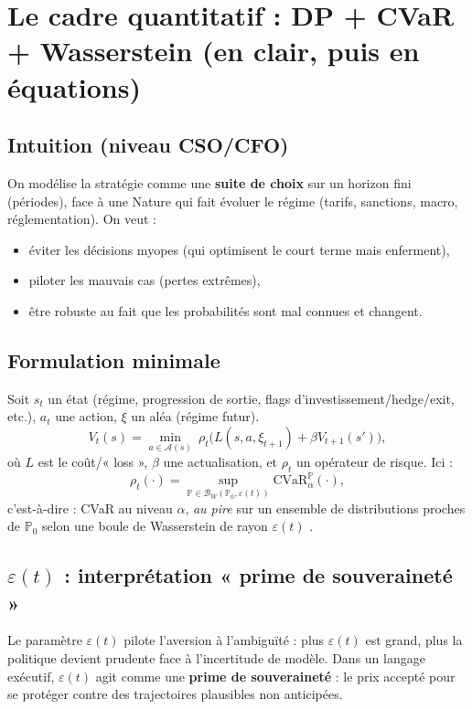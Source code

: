 \documentclass[11pt,a4paper]{article}
\begin{document}
\section{Le cadre quantitatif : DP + CVaR + Wasserstein (en clair, puis en équations)}

\subsection{Intuition (niveau CSO/CFO)}
On modélise la stratégie comme une \textbf{suite de choix} sur un horizon fini (périodes), face à une Nature qui fait évoluer le régime (tarifs, sanctions, macro, réglementation). On veut :
\begin{itemize}
\item éviter les décisions myopes (qui optimisent le court terme mais enferment),
\item piloter les mauvais cas (pertes extrêmes),
\item être robuste au fait que les probabilités sont mal connues et changent.
\end{itemize}

\subsection{Formulation minimale}
Soit \(s_t\) un état (régime, progression de sortie, flags d’investissement/hedge/exit, etc.), \(a_t\) une action, \(\xi\) un aléa (régime futur).
\[
V_t(s) = \min_{a \in \mathcal{A}(s)} \ \rho_t\Big( L(s,a,\xi_{t+1}) + \beta V_{t+1}(s') \Big),
\]
où \(L\) est le coût/« loss », \(\beta\) une actualisation, et \(\rho_t\) un opérateur de risque. Ici :
\[
\rho_t(\cdot)=\sup_{\mathbb{P} \in \mathcal{B}_W(\mathbb{P}_0,\varepsilon(t))}\mathrm{CVaR}_\alpha^{\mathbb{P}}(\cdot),
\]
c’est-à-dire : CVaR au niveau \(\alpha\), \emph{au pire} sur un ensemble de distributions proches de \(\mathbb{P}_0\) selon une boule de Wasserstein de rayon \(\varepsilon(t)\) \citep{rockafellarryasev2000,esfahani-kuhn2018}.

\subsection{\(\varepsilon(t)\) : interprétation « prime de souveraineté »}
Le paramètre \(\varepsilon(t)\) pilote l’aversion à l’ambiguïté : plus \(\varepsilon(t)\) est grand, plus la politique devient prudente face à l’incertitude de modèle. Dans un langage exécutif, \(\varepsilon(t)\) agit comme une \textbf{prime de souveraineté} : le prix accepté pour se protéger contre des trajectoires plausibles non anticipées.
\end{document}
